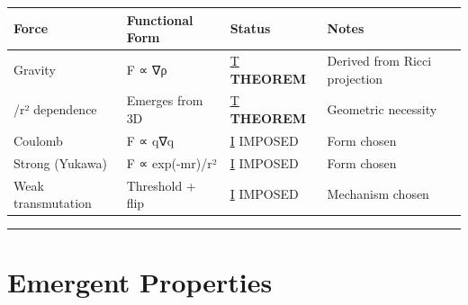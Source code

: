 \documentclass[
  11pt,
  letterpaper,
  twoside,
  openany]{book}
\makeatletter
\let\orig@section\section
\renewcommand{\section}{\needspace{8\baselineskip}\orig@section}
\makeatother
\begin{document}
\begin{longtable}[]{@{}
  >{\raggedright\arraybackslash}p{}
  >{\raggedright\arraybackslash}p{}
  >{\raggedright\arraybackslash}p{}
  >{\raggedright\arraybackslash}p{}@{}}
\toprule\noalign{}
\begin{minipage}[b]{\linewidth}\raggedright
Force
\end{minipage} & \begin{minipage}[b]{\linewidth}\raggedright
Functional Form
\end{minipage} & \begin{minipage}[b]{\linewidth}\raggedright
Status
\end{minipage} & \begin{minipage}[b]{\linewidth}\raggedright
Notes
\end{minipage} \\
\midrule\noalign{}
\endhead
\bottomrule\noalign{}
\endlastfoot
Gravity & F ∝ ∇ρ & \hyperref[t]{T} \textbf{THEOREM} & Derived from Ricci
projection \\
1/r² dependence & Emerges from 3D & \hyperref[t]{T} \textbf{THEOREM} &
Geometric necessity \\
Coulomb & F ∝ q∇q & \hyperref[i]{I} IMPOSED & Form chosen \\
Strong (Yukawa) & F ∝ exp(-mr)/r² & \hyperref[i]{I} IMPOSED & Form
chosen \\
Weak transmutation & Threshold + flip & \hyperref[i]{I} IMPOSED &
Mechanism chosen \\
\end{longtable}

\begin{center}\rule{0.5\linewidth}{0.5pt}\end{center}

\section{Emergent Properties}\label{emergent-properties}
\end{document}
